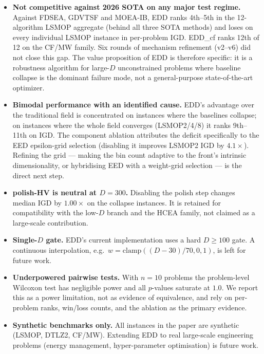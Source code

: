 \documentclass[preprint,12pt]{elsarticle}
\begin{document}
\begin{itemize}
\item \textbf{Not competitive against 2026 SOTA on any major test regime.}
Against FDSEA, GDVTSF and MOEA-IB, EDD ranks 4th--5th in the 12-algorithm
LSMOP aggregate (behind all three SOTA methods) and loses on every
individual LSMOP instance in per-problem IGD. EDD\_cf ranks 12th of 12 on
the CF/MW family. Six rounds of mechanism refinement (v2--v6) did not close
this gap. The value proposition of EDD is therefore specific: it is a
robustness algorithm for large-$D$ unconstrained problems where baseline
collapse is the dominant failure mode, not a general-purpose state-of-the-art
optimizer.

\item \textbf{Bimodal performance with an identified cause.} EDD's advantage
over the traditional field is concentrated on instances where the baselines
collapse; on instances where the whole field converges (LSMOP2/4/8) it ranks
9th--11th on IGD. The component ablation attributes the deficit specifically
to the EED epsilon-grid selection (disabling it improves LSMOP2 IGD by
$4.1\times$). Refining the grid --- making the bin count adaptive to the
front's intrinsic dimensionality, or hybridising EED with a weight-grid
selection --- is the direct next step.

\item \textbf{polish-HV is neutral at $D = 300$.} Disabling the polish step
changes median IGD by $1.00\times$ on the collapse instances. It is retained
for compatibility with the low-$D$ branch and the HCEA family, not claimed as
a large-scale contribution.

\item \textbf{Single-$D$ gate.} EDD's current implementation uses a hard
$D \ge 100$ gate. A continuous interpolation, e.g.\
$w = \mathrm{clamp}((D-30)/70, 0, 1)$, is left for future work.

\item \textbf{Underpowered pairwise tests.} With $n = 10$ problems the
problem-level Wilcoxon test has negligible power and all $p$-values saturate
at $1.0$. We report this as a power limitation, not as evidence of
equivalence, and rely on per-problem ranks, win/loss counts, and the ablation
as the primary evidence.

\item \textbf{Synthetic benchmarks only.} All instances in the paper are
synthetic (LSMOP, DTLZ2, CF/MW). Extending EDD to real large-scale
engineering problems (energy management, hyper-parameter optimisation) is
future work.


\end{itemize}
\end{document}
